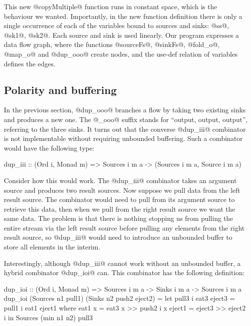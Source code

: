 This new @copyMultiple@ function runs in constant space, which is the behaviour we wanted. Importantly, in the new function definition there is only a single occurrence of each of the variables bound to sources and sinks: @ss@, @sk1@, @sk2@. Each source and sink is used linearly. Our program expresses a data flow graph, where the functions @sourceFs@, @sinkFs@, @fold_o@, @map_o@ and @dup_ooo@ create nodes, and the use-def relation of variables defines the edges.


\subsection{Polarity and buffering}
In the previous section, @dup_ooo@ branches a flow by taking two existing sinks and produces a new one. The @_ooo@ suffix stands for ``output, output, output'', referring to the three sinks. It turns out that the converse @dup_iii@ combinator is not implementable without requiring unbounded buffering. Such a combinator would have the following type:
\begin{code}
 dup_iii :: (Ord i, Monad m)
         =>  Sources i m a 
         -> (Sources i m a, Source i m a)
\end{code}

Consider how this would work. The @dup_iii@ combinator takes an argument source and produces two result sources. Now suppose we pull data from the left result source. The combinator would need to pull from its argument source to retrieve this data, then when we pull from the right result source we want the same data. The problem is that there is nothing stopping us from pulling the entire stream via the left result source before pulling any elements from the right result source, so @dup_iii@ would need to introduce an unbounded buffer to store all elements in the interim.

Interestingly, although @dup_iii@ cannot work without an unbounded buffer, a hybrid combinator @dup_ioi@ can. This combinator has the following definition:
\begin{code}
dup_ioi :: (Ord i, Monad m)
        => Sources i m a -> Sinks i m a 
        -> Sources i m a
dup_ioi (Sources n1 pull1) (Sinks n2 push2 eject2)
 = let pull3 i eat3 eject3
        = pull1 i eat1 eject1
        where eat1 x = eat3 x >> push2  i x
              eject1 = eject3 >> eject2 i
   in  Sources (min n1 n2) pull3
\end{code}

